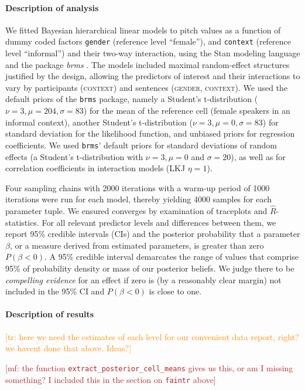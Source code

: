 \documentclass[nobib]{tufte-handout}
\renewcommand{\mf}[1]{\textcolor{firebrick}{[mf: #1]}}
\newcommand{\tr}[1]{\textcolor{DarkOrange}{[tr: #1]}}
\begin{document}
\paragraph{Description of analysis}  
We fitted Bayesian hierarchical linear models to pitch values as a function of dummy coded
factors \texttt{gender} (reference level ``female''), and \texttt{context} (reference level
``informal'') and their two-way interaction, using the Stan modeling language
\citep{carpenter2016stan} and the package \emph{brms} \citep{buerkner2016brms}. The models
included maximal random-effect structures justified by the design, allowing the predictors of
interest and their interactions to vary by participants (\textsc{context}) and sentences
(\textsc{gender}, \textsc{context}). We used the default priors of the \texttt{brms} package,
namely a Student's t-distribution ($\nu = 3, \mu = 204, \sigma = 83$) for the mean of the
reference cell (female speakers in an informal context), another Student's t-distribution ($\nu
= 3, \mu = 0, \sigma = 83$) for standard deviation for the likelihood function, and unbiased
priors for regression coefficients. We used \texttt{brms}' default priors for standard
deviations of random effects (a Student's t-distribution with $\nu = 3, \mu = 0$ and $\sigma =
20$), as well as for correlation coefficients in interaction models (LKJ $\eta = 1$).

Four sampling chains with 2000 iterations with a warm-up period of 1000 iterations were run for
each model, thereby yielding 4000 samples for each parameter tuple.
We ensured converges by examination of traceplots and $\hat{R}$-statistics.
For all relevant predictor levels and differences between them, we report 95\% credible
intervals (CIs) and the posterior probability that a parameter $\beta$, or a measure derived
from estimated parameters, is greater than zero $P(\beta < 0)$. A 95\% credible interval demarcates the range of values that comprise 95\% of probability density or mass of our posterior beliefs. We judge there to be \emph{compelling evidence
} for an effect if zero is (by a reasonably clear margin) not included in the 95\% CI and $P(\beta < 0)$ is close to one.

\paragraph{Description of results}  
\tr{here we need the estimates of each level for our convenient data report, right? we havent done that above. Ideas?}

\mf{the function \texttt{extract\_posterior\_cell\_means} gives us this, or am I missing something? I included this in the section on \texttt{faintr} above}
\end{document}
